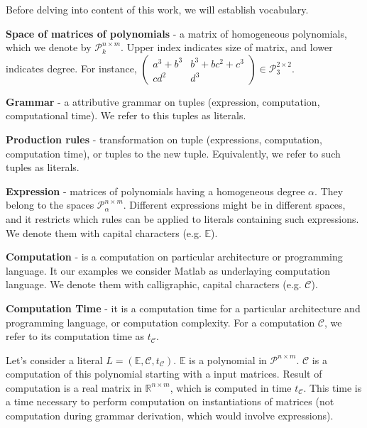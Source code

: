 Before delving into content of this work, we will establish vocabulary.


{\bf Space of matrices of polynomials} - a matrix of homogeneous polynomials, which we denote by $\mathcal{P}^{n \times m}_k$. Upper index indicates size of matrix, and lower indicates degree. For instance, $\begin{pmatrix} a^3 + b^3 & b^3 + bc^2 + c^3\\ cd^2 & d^3 \end{pmatrix} \in \mathcal{P}^{2 \times 2}_3$. 


{\bf Grammar} - a attributive grammar on tuples (expression, computation, computational time). We refer to this tuples as literals. 


{\bf Production rules} - transformation on tuple (expressions, computation, computation time), or tuples to the new tuple. Equivalently, we refer to such tuples as literals. 


{\bf Expression} - matrices of polynomials having a homogeneous degree $\alpha$. They belong to the spaces $\mathcal{P}^{n \times m}_\alpha$. Different expressions might be in different spaces, and it restricts which rules can be 
applied to literals containing such expressions. We denote them with capital characters (e.g. $\mathbb{E}$).


{\bf Computation} - is a computation on particular architecture or programming language. It our examples we consider Matlab as underlaying computation language. We denote them with calligraphic, capital characters (e.g. $\mathcal{C}$).


{\bf Computation Time} - it is a computation time for a particular architecture and programming language, or computation complexity. For a computation $\mathcal{C}$, we refer to its computation time as $t_{\mathcal{C}}$. 


Let's consider a literal $L = (\mathbb{E}, \mathcal{C}, t_\mathcal{C})$. $\mathbb{E}$ is a polynomial in $\mathcal{P}^{n \times m}$. $\mathcal{C}$ is a computation of this polynomial starting with a input matrices. Result of computation is a real matrix
in $\mathbb{R}^{n \times m}$, which is computed in time $t_\mathcal{C}$. This time is a time necessary to perform computation on instantiations of matrices (not computation during grammar derivation, which would involve expressions).

